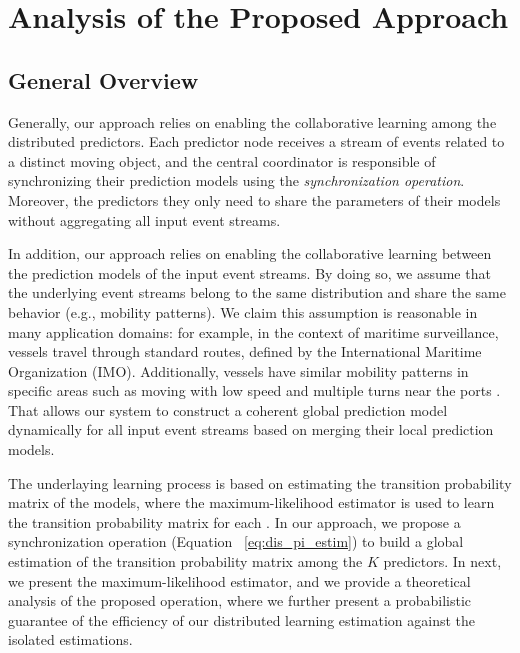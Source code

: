 \section{Analysis of the Proposed Approach}

\subsection{General  Overview}
\par Generally, our approach relies on enabling the collaborative learning among the distributed predictors. Each predictor node receives a stream of events related to a distinct moving object, and the central coordinator is responsible of synchronizing their prediction models using the \textit{synchronization operation}. Moreover, the predictors they only need to share the parameters of their models without aggregating all input event streams. 

\par In addition, our approach relies on enabling the collaborative learning between the prediction models of the input event streams. By doing so, we assume that the underlying event streams belong to the same  distribution and share the same behavior (e.g., mobility patterns). We claim this assumption is reasonable in many application domains: for example, in the context of maritime surveillance, vessels travel through standard routes, defined by the International Maritime Organization (IMO). Additionally, vessels have similar mobility patterns in specific areas such as moving with low speed and multiple turns near the ports \cite{pallotta2013vessel,liu2014knowledge}. That allows our system to construct a coherent global prediction model dynamically for all input event streams based on merging their local prediction models.

\par The underlaying learning process is based on estimating the transition probability matrix of the \pmcmr models, where the maximum-likelihood estimator  \cite{anderson1957statistical} is used to learn the transition probability matrix for each \pmcmr. In our approach, we propose a synchronization operation (Equation ~\ref{eq:dis_pi_estim}) to build a global estimation of the transition probability matrix among the \emph{$K$} predictors. In next, we present the maximum-likelihood estimator, and we  provide a theoretical analysis of the proposed operation, where we further present a probabilistic guarantee of the efficiency of our distributed learning estimation against the isolated estimations.   


